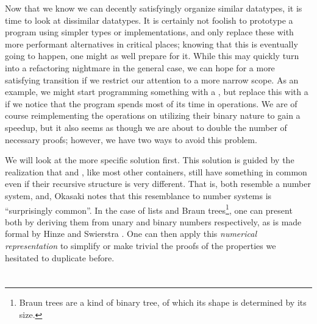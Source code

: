 
Now that we know we can decently satisfyingly organize similar datatypes, it is time to look at dissimilar datatypes. It is certainly not foolish to prototype a program using simpler types or implementations, and only replace these with more performant alternatives in critical places; knowing that this is eventually going to happen, one might as well prepare for it. While this may quickly turn into a refactoring nightmare in the general case, we can hope for a more satisfying transition if we restrict our attention to a more narrow scope. As an example, we might start programming something with a , but replace this with a  if we notice that the program spends most of its time in  operations. We are of course reimplementing the operations on  utilizing their binary nature to gain a speedup, but it also seems as though we are about to double the number of necessary proofs; however, we have two ways to avoid this problem. 

We will look at the more specific solution first. This solution is guided by the realization that  and , like most other containers, still have something in common even if their recursive structure is very different. That is, both resemble a number system, and, Okasaki \cite{purelyfunctional} notes that this resemblance to number systems is ``surprisingly common''. In the case of lists and Braun trees\footnote{Braun trees are a kind of binary tree, of which its shape is determined by its size.}, one can present both by deriving them from unary and binary numbers respectively, as is made formal by Hinze and Swierstra \cite{calcdata}. One can then apply this \textit{numerical representation} to simplify or make trivial the proofs of the properties we hesitated to duplicate before.




\section{}

